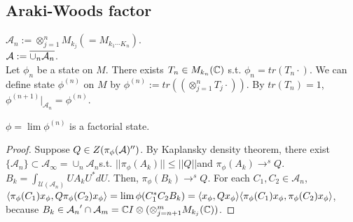 \subsection{Araki-Woods factor}
$\mathcal{A}_n := \otimes_{j=1}^{n} M_{k_j} (= M_{k_1 \cdots K_n})$.\\
$\mathcal{A} := \overline{\cup_n \mathcal{A}_n}$.\\
Let $\phi_n$ be a state on $M$. There exists $T_n \in M_{k_n}(\mathbb{C})$ s.t. $\phi_n = tr(T_n \cdot)$.
We can define state $\phi^{(n)}$ on $M$ by $\phi^{(n)} := tr((\otimes_{j=1}^nT_j \cdot))$.
By $tr(T_n) = 1$, $\phi^{(n+1)}|_{\mathcal{A}_n} = \phi^{(n)}$.
\begin{theorem}
  $\phi = \lim \phi^{(n)}$ is a factorial state.
\end{theorem}

\begin{proof}
  Suppose $Q \in Z(\pi_\phi(\mathcal{A})'')$.
  By Kaplansky density theorem, there exist $\{\mathcal{A}_n\} \subset \mathcal{A}_\infty = \cup_n \mathcal{A}_n$s.t. $||\pi_\phi(A_k)|| \leq ||Q|| $and $ \pi_\phi(A_k) \rightarrow^s Q$.
  $B_k = \int_{\mathcal{U}(\mathcal{A}_n)} UA_kU^{*} dU$.
  Then, $\pi_\phi (B_k) \rightarrow^s Q$.
  For each $C_1, C_2 \in \mathcal{A}_n$, $\langle\pi_\phi(C_1)x_\phi, Q\pi_\phi(C_2)x_\phi\rangle=\lim \phi(C_1^*C_2B_k) = \langle x_\phi,Qx_\phi\rangle\langle\pi_\phi(C_1)x_\phi, \pi_\phi(C_2)x_\phi\rangle$,
  because $B_k \in {\mathcal{A}_n}'\cap \mathcal{A}_m = \mathbb{C} I \otimes (\otimes_{j=n+1}^m M_{k_j}(\mathbb{C}))$.
\end{proof}
